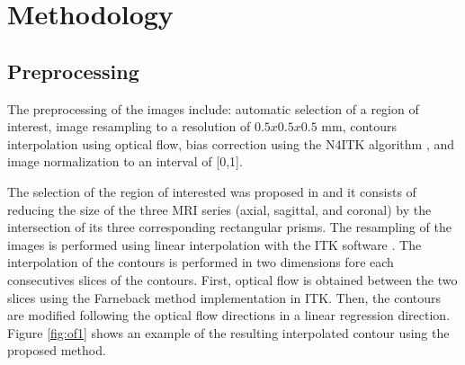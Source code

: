 \section{Methodology}
\label{sec:methods}

\subsection{Preprocessing}
\label{subsec:prepro}
The preprocessing of the images include: automatic selection of a region
of interest, image resampling to a resolution of $0.5 x 0.5 x 0.5$ mm, contours interpolation
using optical flow, bias correction using the N4ITK algorithm \cite{n4itk}, and
image normalization to an interval of [0,1].

The selection of the region of interested was proposed in \cite{anneke} and it 
consists of reducing the size of the three MRI series (axial, sagittal, and coronal)
by the intersection of its three corresponding rectangular prisms. The resampling
of the images is performed using linear interpolation with the ITK software \cite{itk}. 
The interpolation of the contours is performed in two dimensions fore each consecutives slices
of the contours. First, optical flow is obtained between the two slices using the  
Farneback method implementation in ITK. Then, the contours are modified following
the optical flow directions in a linear regression direction. Figure \ref{fig:of1} shows an
example of the resulting interpolated contour using the proposed method. 
